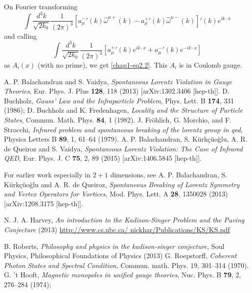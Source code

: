 On Fourier transforming
\begin{equation*}
\int \frac{d^3k}{\sqrt{2k_0}} \frac{1}{(2 \pi)^3} \left[ {a_\mu^-}' (k) \hat{\omega}^{\mu +} (k) - {a_\mu^+}' (k) \hat{\omega}^{\mu -} (k)\right]' (k) e^{ik \cdot x} \label{chap1-eqA.24}\tag{A.24}
\end{equation*}
and calling
\begin{equation*}
\int \frac{d^3k}{\sqrt{2k_0}} \frac{1}{(2 \pi)^3} \left[ {a_\mu^+}' (k) e^{ik \cdot x} + {a_\mu^-}' (k) e^{-i k \cdot x}\right] \label{chap1-eqA.25}\tag{A.25}
\end{equation*}
as $A_i (x)$ (with no prime), we get \eqref{chap1-eq2.2}. This $A_i$ is in Coulomb gauge.


\begin{thebibliography}{99}
 A. P. Balachandran and S. Vaidya, \textit{Spontaneous Lorentz Violation in Gauge Theories}, Eur. Phys. J. Plus \textbf{128}, 118 (2013) [arXiv:1302.3406 [hep-th]]. 
 D. Buchholz, \textit{Gauss' Law and the Infraparticle Problem}, Phys. Lett. B \textbf{174}, 331 (1986); D. Buchholz and K. Fredenhagen, \textit{Locality and the Structure of Particle States}, Commun. Math. Phys. \textbf{84}, 1 (1982). 
 J. Fr\"ohlich, G. Morchio, and F. Strocchi, \textit{Infrared problem and spontaneous breaking of the lorentz group in qed}, Physics Letters B \textbf{89}, 1, 61--64 (1979).
 A. P. Balachandran, S. K\"urk\c{c}\"uo\u{g}lu, A. R. de Queiroz and S. Vaidya, \textit{Spontaneous Lorentz Violation: The Case of Infrared QED}, Eur. Phys. J. C \textbf{75}, 2, 89 (2015) [arXiv:1406.5845 [hep-th]].

For earlier work especially in $2+1$ dimensions, see A. P. Balachandran, S. K\"urk\c{c}\"uo\u{g}lu and A. R. de Queiroz, \textit{Spontaneous Breaking of Lorentz Symmetry and Vertex Operators for Vortices}, Mod. Phys. Lett. A \textbf{28}, 1350028 (2013) [arXiv:1208.3175 [hep-th]].

 N. J. A. Harvey, \textit{An introduction to the Kadison-Singer Problem and the Paving Conjecture} (2013) \url{http://www.cs.ubc.ca/ nickhar/Publications/KS/KS.pdf} 

B. Roberts, \textit{Philosophy and physics in the kadison-singer conjecture}, Soul Physics, Philosophical Foundations of Physics (2013)
 G. Roepstorff, \textit{Coherent Photon States and Spectral Condition}, Commun. math. Phys. 19, 301--314 (1970).
 G. 't Hooft, \textit{Magnetic monopoles in unified gauge theories}, Nuc. Phys. B \textbf{79}, 2, 276--284 (1974);


\end{thebibliography}
